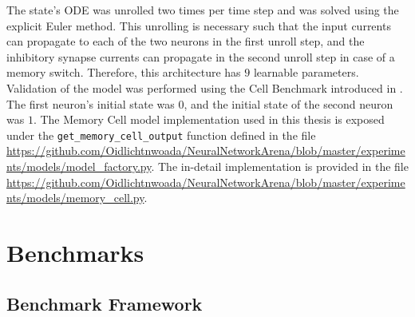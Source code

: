 \documentclass[draft,final]{vutinfth} %
\begin{document}
    The state's ODE was unrolled two times per time step and was solved using the explicit Euler method.
    This unrolling is necessary such that the input currents can propagate to each of the two neurons in the first unroll step, and the inhibitory synapse currents can propagate in the second unroll step in case of a memory switch.
    Therefore, this architecture has $9$ learnable parameters.
    Validation of the model was performed using the Cell Benchmark introduced in .
    The first neuron's initial state was $0$, and the initial state of the second neuron was $1$.
    The Memory Cell model implementation used in this thesis is exposed under the \texttt{get\_memory\_cell\_output} function defined in the file \url{https://github.com/Oidlichtnwoada/NeuralNetworkArena/blob/master/experiments/models/model_factory.py}.
    The in-detail implementation is provided in the file \url{https://github.com/Oidlichtnwoada/NeuralNetworkArena/blob/master/experiments/models/memory_cell.py}.


    \chapter{Benchmarks}


    \section{Benchmark Framework} \label{benchmark_framework}
\end{document}
